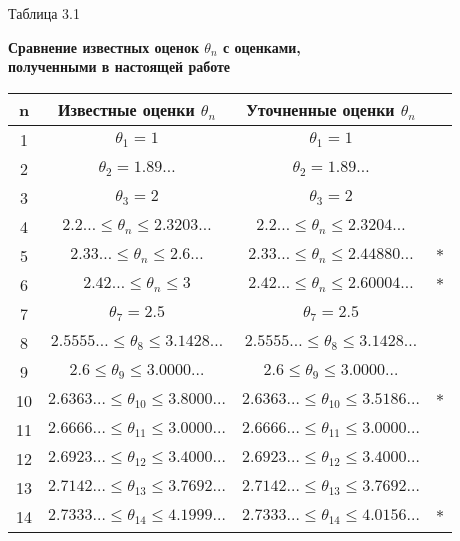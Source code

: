 \documentclass[14pt,a4paper]{extbook}
\begin{document}
\newpage
\begin{flushright}
	Таблица 3.1
\end{flushright}
\begin{center}
	{\bf Сравнение известных оценок $\theta_n$ с оценками, \\ полученными в настоящей работе}
\end{center}
\begin{center}
	\begin{tabular}{|c|c|c|c|} \hline
		n& Известные оценки $\theta_n$ & Уточненные оценки $\theta_n$  & \\ \hline
		1 & $\theta_1 = 1$ & $\theta_1 = 1$ & \\ \hline
		2 & $\theta_2 = 1.89\ldots$ & $\theta_2 = 1.89\ldots$ & \\ \hline
		3 & $\theta_3 = 2$ & $\theta_3 = 2$ & \\ \hline
		4 & $2.2\ldots \leqslant\theta_n\leqslant2.3203\ldots$ & $2.2\ldots \leqslant\theta_n\leqslant2.3204\ldots$ & \\ \hline
		5 & $2.33\ldots \leqslant\theta_n\leqslant2.6\ldots$& $2.33\ldots \leqslant\theta_n\leqslant2.44880\ldots $ & $*$ \\\hline
		6 & $2.42\ldots \leqslant\theta_n\leqslant3$ & $2.42\ldots \leqslant\theta_n\leqslant2.60004\ldots$  &  $*$ \\ \hline
		7 & $\theta_7 = 2.5$& $\theta_7 = 2.5$  & \\ \hline
		8 & $2.5555\ldots\leqslant\theta_8\leqslant3.1428\dots$ &  $2.5555\ldots\leqslant\theta_8\leqslant3.1428\dots$  &  \\ \hline
		9 &$2.6\leqslant\theta_9\leqslant3.0000\ldots$ & $2.6\leqslant\theta_9\leqslant3.0000\ldots$ & \\ \hline
		10 &$2.6363\ldots\leqslant\theta_{10}\leqslant3.8000\dots$ &$2.6363\ldots\leqslant\theta_{10}\leqslant3.5186\dots$ &  $*$  \\ \hline
		11 &$2.6666\ldots\leqslant\theta_{11}\leqslant3.0000\dots$ &$2.6666\ldots\leqslant\theta_{11}\leqslant3.0000\dots$   & \\ \hline
		12 & $2.6923\ldots\leqslant\theta_{12}\leqslant3.4000\dots$& $2.6923\ldots\leqslant\theta_{12}\leqslant3.4000\dots$  & \\ \hline
		13 & $2.7142\ldots\leqslant\theta_{13}\leqslant3.7692\dots$ &$2.7142\ldots\leqslant\theta_{13}\leqslant3.7692\dots$  & \\ \hline
		14 &$2.7333\ldots\leqslant\theta_{14}\leqslant4.1999\dots$ & $2.7333\ldots\leqslant\theta_{14}\leqslant4.0156\dots$ &  $*$ \\ \hline

\end{tabular}
\end{center}
\end{document}

